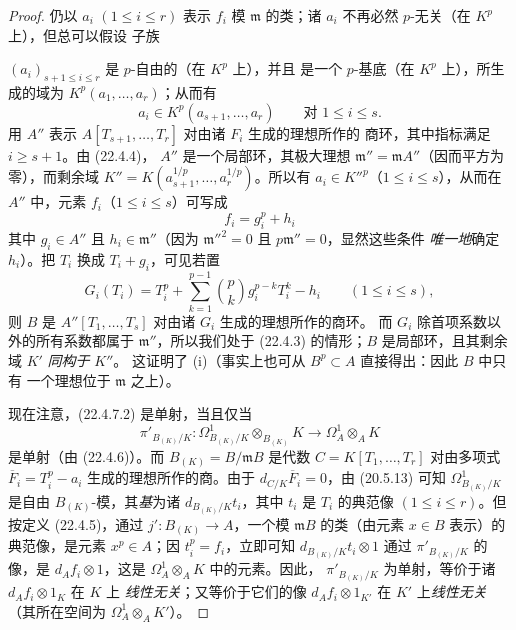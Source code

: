 \begin{proof}
仍以 $a_i$ $(1\leqslant i\leqslant r)$ 表示 $f_i$ 模
$\mathfrak m$ 的类；诸 $a_i$ 不再必然 $p$-无关（在 $K^p$ 上），但总可以假设
子族


$(a_i)_{s+1\leqslant i\leqslant r}$ 是 $p$-自由的（在 $K^p$ 上），并且
是一个 $p$-基底（在 $K^p$ 上），所生成的域为
$K^p(a_1,\ldots,a_r)$；从而有
\[
  a_i\in K^p(a_{s+1},\ldots,a_r)\qquad\text{对 }1\leqslant i\leqslant s.
\]
用 $A''$ 表示 $A[T_{s+1},\ldots,T_r]$ 对由诸 $F_i$ 生成的理想所作的
商环，其中指标满足 $i\geqslant s+1$。由 (22.4.4)，
$A''$ 是一个局部环，其极大理想
$\mathfrak m''=\mathfrak mA''$（因而平方为零），而剩余域
$K''=K(a_{s+1}^{1/p},\ldots,a_r^{1/p})$。所以有
$a_i\in K''^p$（$1\leqslant i\leqslant s$），从而在 $A''$ 中，元素
$f_i$（$1\leqslant i\leqslant s$）可写成
\begin{equation}
\label{0.22.4.7.3-fr}
  f_i=g_i^p+h_i
  \tag{22.4.7.3}
\end{equation}
其中 $g_i\in A''$ 且 $h_i\in\mathfrak m''$（因为
$\mathfrak m''^2=0$ 且 $p\mathfrak m''=0$，显然这些条件
\emph{唯一地}确定 $h_i$）。把 $T_i$ 换成 $T_i+g_i$，可见若置
\[
  G_i(T_i)=T_i^p+\sum_{k=1}^{p-1}\binom pk g_i^{p-k}T_i^k-h_i
  \qquad(1\leqslant i\leqslant s),
\]
则 $B$ 是 $A''[T_1,\ldots,T_s]$ 对由诸 $G_i$ 生成的理想所作的商环。
而 $G_i$ 除首项系数以外的所有系数都属于 $\mathfrak m''$，所以我们处于
(22.4.3) 的情形；$B$ 是局部环，且其剩余域 $K'$ \emph{同构于} $K''$。
这证明了 (i)（事实上也可从 $B^p\subset A$ 直接得出：因此 $B$ 中只有
一个理想位于 $\mathfrak m$ 之上）。

现在注意，(22.4.7.2) 是单射，当且仅当
\[
  \pi'_{B_{(K)}/K}:\Omega^1_{B_{(K)}/K}\otimes_{B_{(K)}}K
  \longrightarrow\Omega^1_A\otimes_AK
\]
是单射（由 (22.4.6)）。而 $B_{(K)}=B/\mathfrak mB$ 是代数
$C=K[T_1,\ldots,T_r]$ 对由多项式
$\overline F_i=T_i^p-a_i$ 生成的理想所作的商。由于
$d_{C/K}\overline F_i=0$，由 (20.5.13) 可知
$\Omega^1_{B_{(K)}/K}$ 是自由 $B_{(K)}$-模，其\emph{基}为诸
$d_{B_{(K)}/K}t_i$，其中 $t_i$ 是 $T_i$ 的典范像
$(1\leqslant i\leqslant r)$。但按定义 (22.4.5)，通过
$j':B_{(K)}\longrightarrow A$，一个模 $\mathfrak mB$ 的类（由元素
$x\in B$ 表示）的典范像，是元素 $x^p\in A$；因 $t_i^p=f_i$，立即可知
$d_{B_{(K)}/K}t_i\otimes1$ 通过 $\pi'_{B_{(K)}/K}$ 的像，是
$d_Af_i\otimes1$，这是 $\Omega^1_A\otimes_AK$ 中的元素。因此，
$\pi'_{B_{(K)}/K}$ 为单射，等价于诸 $d_Af_i\otimes1_K$ 在 $K$ 上
\emph{线性无关}；又等价于它们的像 $d_Af_i\otimes1_{K'}$ 在
$K'$ 上\emph{线性无关}（其所在空间为 $\Omega^1_A\otimes_AK'$）。


\end{proof}
